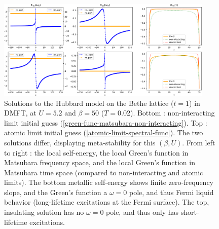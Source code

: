 \documentclass[reprint,amsmath,amssymb,aps,pra]{revtex4-2}
\begin{document}
\begin{figure}[H]
\includegraphics[width=0.92\textwidth]{U52-beta50-sigmaiwn-Giwn-Gtau-both.pdf}
\centering
\caption{\label{fig:U52-beta50-metal-insulator}Solutions to the Hubbard model on the Bethe lattice ($t=1$) in DMFT, at $U=5.2$ and $\beta=50$ ($T=0.02$). Bottom : non-interacting limit initial guess (\ref{green-func-matsubara-non-interacting}). Top : atomic limit initial guess (\ref{atomic-limit-spectral-func}). The two solutions differ, displaying meta-stability for this $(\beta,U)$. From left to right : the local self-energy, the local Green's function in Matsubara frequency space, and the local Green's function in Matsubara time space (compared to non-interacting and atomic limits). The bottom metallic self-energy shows finite zero-frequency slope, and the Green's function a $\omega=0$ pole, and thus Fermi liquid behavior (long-lifetime excitations at the Fermi surface). The top, insulating solution has no $\omega=0$ pole, and thus only has short-lifetime excitations.}
\end{figure}
\end{document}
